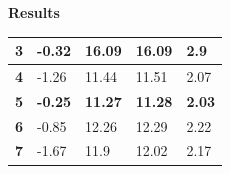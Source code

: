 \documentclass[xcolor=dvipsnames]{beamer}
\begin{document}
\begin{frame}{\bf Results}
\begin{table}[]
\begin{tabular}{|l|llll|}
\textbf{3}  & \multicolumn{1}{l|}{{\color[HTML]{333333} -0.32}}                                     & \multicolumn{1}{l|}{{\color[HTML]{333333} 16.09}}                                      & \multicolumn{1}{l|}{{\color[HTML]{333333} 16.09}}                                    & {\color[HTML]{333333} 2.9}                                                                       \\ \hline
\textbf{4}  & \multicolumn{1}{l|}{{\color[HTML]{333333} -1.26}}                                     & \multicolumn{1}{l|}{{\color[HTML]{333333} 11.44}}                                      & \multicolumn{1}{l|}{{\color[HTML]{333333} 11.51}}                                    & {\color[HTML]{333333} 2.07}                                                                      \\ \hline
\textbf{5}  & \multicolumn{1}{l|}{{\color[HTML]{32CB00} \textbf{-0.25}}}                            & \multicolumn{1}{l|}{{\color[HTML]{32CB00} \textbf{11.27}}}                             & \multicolumn{1}{l|}{{\color[HTML]{32CB00} \textbf{11.28}}}                           & {\color[HTML]{32CB00} \textbf{2.03}}                                                             \\ \hline
\textbf{6}  & \multicolumn{1}{l|}{{\color[HTML]{333333} -0.85}}                                     & \multicolumn{1}{l|}{{\color[HTML]{333333} 12.26}}                                      & \multicolumn{1}{l|}{{\color[HTML]{333333} 12.29}}                                    & {\color[HTML]{333333} 2.22}                                                                      \\ \hline
\textbf{7}  & \multicolumn{1}{l|}{{\color[HTML]{333333} -1.67}}                                     & \multicolumn{1}{l|}{{\color[HTML]{333333} 11.9}}                                       & \multicolumn{1}{l|}{{\color[HTML]{333333} 12.02}}                                    & {\color[HTML]{333333} 2.17}                                                                      \\ \hline
\end{tabular}
\end{table}

\end{frame}
\end{document}
